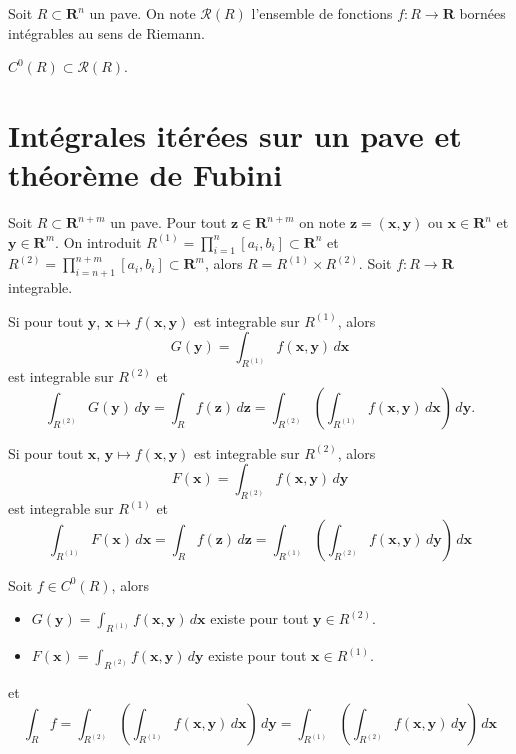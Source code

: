 \begin{notation}
Soit $R\subset \mathbf{R}^{n}$ un pave. On note $\mathcal{R}(R)$ l'ensemble de fonctions $f:R\to \mathbf{R}$ bornées intégrables au sens de Riemann.
\end{notation}
\begin{remark}
$C^{0}(R)\subset \mathcal{R}(R)$.
\end{remark}
\section{Intégrales itérées sur un pave et théorème de Fubini}
\begin{theorem}
Soit $R\subset \mathbf{R}^{n+m}$ un pave. Pour tout $\boldsymbol{z}\in \mathbf{R}^{n+m}$ on note $\boldsymbol{z}=(\boldsymbol{x},\boldsymbol{y})$ ou $\boldsymbol{x}\in \mathbf{R}^{n}$ et $\boldsymbol{y}\in \mathbf{R}^{m}$. On introduit $R^{(1)}=\prod_{i=1}^{n}[a_{i},b_{i}]\subset \mathbf{R}^{n}$ et $R^{(2)}=\prod_{i=n+1}^{n+m}[a_{i},b_{i}]\subset \mathbf{R}^{m}$, alors $R=R^{(1)}\times R^{(2)}$.  Soit $f:R\to\mathbf{R}$ integrable.

Si pour tout $\boldsymbol{y}$, $\boldsymbol{x}\mapsto f(\boldsymbol{x},\boldsymbol{y})$ est integrable sur $R^{(1)}$, alors 
$$
G(\boldsymbol{y})=\int _{R^{(1)}}f(\boldsymbol{x},\boldsymbol{y})\,d\boldsymbol{x}
$$
est integrable sur $R^{(2)}$ et 
$$
\int _{R^{(2)}}G(\boldsymbol{y})\,d\boldsymbol{y}=\int _{R}f(\boldsymbol{z})\,d\boldsymbol{z}=\int _{R^{(2)}}\left( \int _{R^{(1)}}f(\boldsymbol{x},\boldsymbol{y})\,d\boldsymbol{x} \right)\,d\boldsymbol{y}.
$$

Si pour tout $\boldsymbol{x}$, $\boldsymbol{y}\mapsto f(\boldsymbol{x},\boldsymbol{y})$ est integrable sur $R^{(2)}$, alors
$$
F(\boldsymbol{x})=\int _{R^{(2)}}f(\boldsymbol{x},\boldsymbol{y})\,d\boldsymbol{y}
$$
est integrable sur $R^{(1)}$ et
$$
\int _{R^{(1)}}F(\boldsymbol{x})\,d\boldsymbol{x}=\int _{R}f(\boldsymbol{z})\,d\boldsymbol{z}=\int _{R^{(1)}}\left( \int _{R^{(2)}}f(\boldsymbol{x},\boldsymbol{y})\,d\boldsymbol{y} \right)\,d\boldsymbol{x}
$$
\end{theorem}
\begin{corollary}
Soit $f\in C^{0}(R)$, alors
\begin{itemize}
\item $G(\boldsymbol{y})=\int _{R^{(1)}}f(\boldsymbol{x},\boldsymbol{y})\,d\boldsymbol{x}$ existe pour tout $\boldsymbol{y}\in R^{(2)}$.
\item $F(\boldsymbol{x})=\int _{R^{(2)}}f(\boldsymbol{x},\boldsymbol{y})\,d\boldsymbol{y}$ existe pour tout $\boldsymbol{x}\in R^{(1)}$.
\end{itemize}
et 
$$
\int _{R}f=\int _{R^{(2)}}\left( \int _{R^{(1)}}f(\boldsymbol{x},\boldsymbol{y})\,d\boldsymbol{x} \right)\,d\boldsymbol{y}=\int _{R^{(1)}}\left( \int _{R^{(2)}}f(\boldsymbol{x},\boldsymbol{y})\,d\boldsymbol{y} \right)\,d\boldsymbol{x}
$$
\end{corollary}

